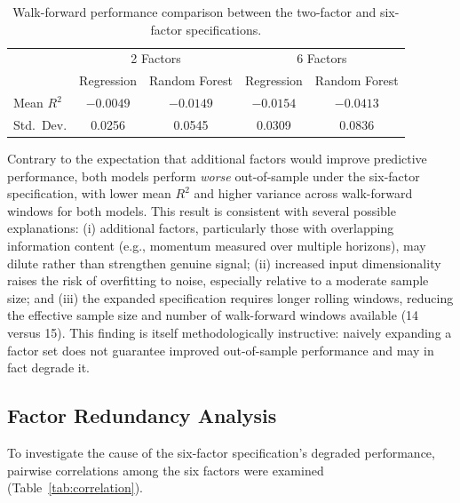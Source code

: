\documentclass[11pt]{article}
\begin{document}
\begin{table}[h]
\centering
\begin{tabular}{lcccc}
\toprule
& \multicolumn{2}{c}{2 Factors} & \multicolumn{2}{c}{6 Factors} \\
& Regression & Random Forest & Regression & Random Forest \\
\midrule
Mean $R^2$ & $-0.0049$ & $-0.0149$ & $-0.0154$ & $-0.0413$ \\
Std.\ Dev. & 0.0256 & 0.0545 & 0.0309 & 0.0836 \\
\bottomrule
\end{tabular}
\caption{Walk-forward performance comparison between the two-factor and six-factor specifications.}
\label{tab:factor_comparison}
\end{table}

Contrary to the expectation that additional factors would improve predictive performance, both models perform \emph{worse} out-of-sample under the six-factor specification, with lower mean $R^2$ and higher variance across walk-forward windows for both models. This result is consistent with several possible explanations: (i) additional factors, particularly those with overlapping information content (e.g., momentum measured over multiple horizons), may dilute rather than strengthen genuine signal; (ii) increased input dimensionality raises the risk of overfitting to noise, especially relative to a moderate sample size; and (iii) the expanded specification requires longer rolling windows, reducing the effective sample size and number of walk-forward windows available (14 versus 15). This finding is itself methodologically instructive: naively expanding a factor set does not guarantee improved out-of-sample performance and may in fact degrade it.

\subsection{Factor Redundancy Analysis}

To investigate the cause of the six-factor specification's degraded performance, pairwise correlations among the six factors were examined (Table~\ref{tab:correlation}).
\end{document}
